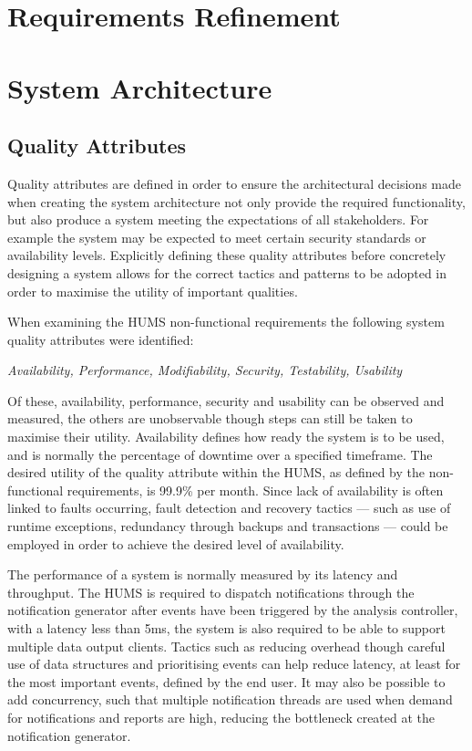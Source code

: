 \documentclass[10pt,a4paper]{article}
\begin{document}
\section{Requirements Refinement}

\section{System Architecture}
\subsection{Quality Attributes}
Quality attributes are defined in order to ensure the architectural decisions made when creating the system architecture not only provide the required functionality, but also produce a system meeting the expectations of all stakeholders. For example the system may be expected to meet certain security standards or availability levels. Explicitly defining these quality attributes before concretely designing a system allows for the correct tactics and patterns to be adopted in order to maximise the utility of important 
qualities.

When examining the HUMS non-functional requirements the following system quality attributes were identified:
	\begin{center}
	\textit{
		Availability, Performance, Modifiability, Security, Testability, Usability}
	\end{center}
Of these, availability, performance, security and usability can be observed and measured, the others are unobservable though steps can still be taken to maximise their utility.
Availability defines how ready the system is to be used, and is normally the percentage of downtime over a specified timeframe. The desired utility of the quality attribute within the HUMS, as defined by the non-functional requirements, is  99.9\% per month. Since lack of availability is often linked to faults occurring, fault detection and recovery tactics --- such as use of runtime exceptions, redundancy through backups and transactions --- could be employed in order to achieve the desired level of availability. 

The performance of a system is normally measured by its latency and throughput. The HUMS is required to dispatch notifications through the notification generator after events have been triggered by the analysis controller, with a latency less than 5ms, the system is 
also required to be able to support multiple data output clients. Tactics such as reducing overhead though careful use of data structures and prioritising events can help reduce latency, at least for the most important events, defined by the end user. It may also be possible to add concurrency, such that multiple notification threads are used when demand for notifications and reports are high, reducing the bottleneck created at the notification generator.
\end{document}
